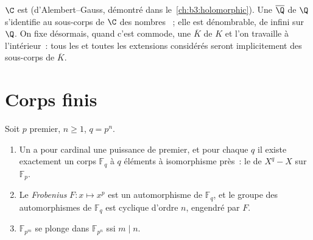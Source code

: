 \begin{remark}\label{rem:b3:galois:closureexamples}
$\C$ est  (d'Alembert--Gauss, démontré dans
le~\cref{ch:b3:holomorphic}). Une  $\overline
\Q$ de $\Q$ s'identifie au sous-corps de $\C$ des nombres
~; elle est dénombrable, de  infini sur $\Q$.
On fixe désormais, quand c'est commode, une 
$\overline K$ de $K$ et l'on travaille à l'intérieur~: tous les
 et toutes les extensions 
considérés seront implicitement des sous-corps de $\overline K$.
\end{remark}

\section{Corps finis}

\begin{theorem}\label{thm:b3:galois:finitefields}
Soit $p$ premier, $n \geq 1$, $q = p^n$.
\begin{enumerate}
  \item Un  a pour cardinal une puissance de premier,
        et pour chaque $q$ il existe exactement un corps
        $\mathbb F_q$ à $q$ éléments à isomorphisme près~: le
         de $X^q - X$ sur $\mathbb
        F_p$.
  \item Le \emph{Frobenius}
        $F \colon x \mapsto x^p$ est un automorphisme de
        $\mathbb F_q$, et le groupe des automorphismes de
        $\mathbb F_q$ est cyclique d'ordre $n$, engendré par
        $F$.
  \item $\mathbb F_{p^m}$ se plonge dans $\mathbb F_{p^n}$ ssi
        $m \mid n$.
\end{enumerate}
\end{theorem}

